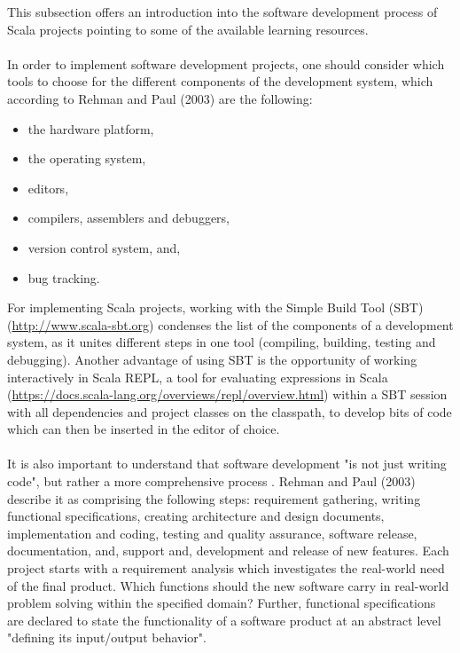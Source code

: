 \documentclass {article}
\begin{document}
This subsection offers an introduction into the software development process of Scala projects pointing to some of the available learning resources.
\\
\\
In order to implement software development projects, one should consider which tools to choose for the different components of the development system, which according to Rehman and Paul (2003) \cite{rehman_linux_2003}are the following:
\begin{itemize}
\item  the hardware platform,
\item  the operating system,
\item  editors,
\item compilers, assemblers and debuggers,
\item  version control system, and,
\item  bug tracking.
\end{itemize} 
For implementing Scala projects, working with the Simple Build Tool (SBT) (\href{http://www.scala-sbt.org}{http://www.scala-sbt.org}) condenses the list of the components of a development system, as it unites different steps in one tool (compiling, building, testing and debugging). Another advantage of using SBT is the opportunity of working interactively in Scala REPL, a tool for evaluating expressions in Scala (\href{https://docs.scala-lang.org/overviews/repl/overview.html}{https://docs.scala-lang.org/overviews/repl/overview.html}) within a SBT session with all dependencies and project classes on the classpath, to develop bits of code which can then be inserted in the editor of choice.
\\
\\  
It is also important to understand that software development "is not just writing code", but rather a more comprehensive process \cite{rehman_linux_2003}. 
Rehman and Paul (2003) describe it as comprising the following steps: requirement gathering, writing functional specifications, creating architecture and design documents, implementation and coding, testing and quality assurance, software release, documentation, and, support and, development and release of new features. 
Each project starts with a requirement analysis which investigates the real-world need of the final product. Which functions should the new software carry in real-world problem solving within the specified domain?
 Further, functional specifications are declared to state the functionality of a software product at an abstract level "defining its input/output behavior". 
\end{document}
